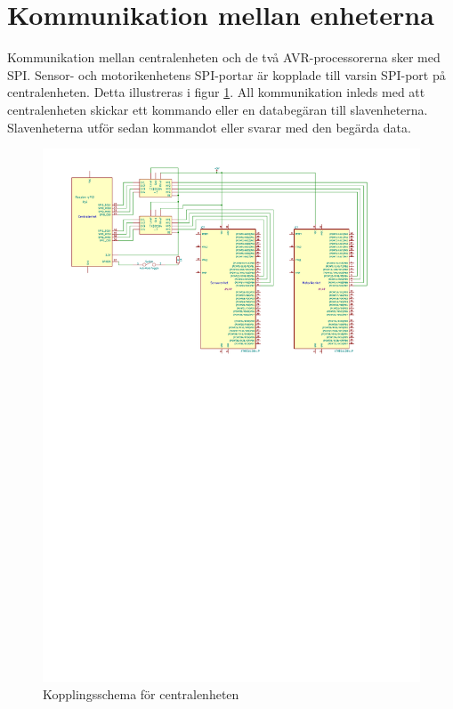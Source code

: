 \documentclass[a4paper,titlepage,12pt]{article}
\begin{document}
	\section{Kommunikation mellan enheterna}
	Kommunikation mellan centralenheten och de två AVR-processorerna sker
	med SPI. Sensor- och motorikenhetens SPI-portar är kopplade till varsin
	SPI-port på centralenheten. Detta illustreras i figur \ref{fig:central_circuit}.
	All kommunikation inleds med att centralenheten skickar ett kommando 
    eller en databegäran till slavenheterna.
	Slavenheterna utför sedan kommandot eller svarar med den begärda data.

	\begin{figure}[htpb]
		\centering
		\includegraphics[width=1.0\linewidth]{charts/central/centralenhet.pdf}
		\caption{Kopplingsschema för centralenheten}
		\label{fig:central_circuit}
	\end{figure}
\end{document}

